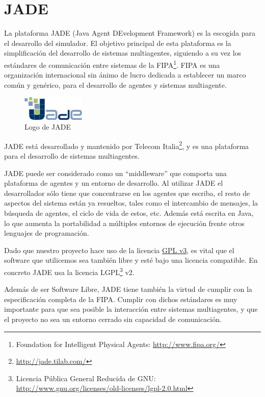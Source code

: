 \section{JADE}

La plataforma JADE (Java Agent DEvelopment Framework) es la escogida para el
desarrollo del simulador. El objetivo principal de esta plataforma es la
simplificación del desarrollo de sistemas multiagentes, siguiendo a su vez los
estándares de comunicación entre sistemas de la FIPA\footnote{Foundation for
Intelligent Physical Agents: \url{http://www.fipa.org/}}. FIPA es una
organización internacional sin ánimo de lucro dedicada a establecer un marco
común y genérico, para el desarrollo de agentes y sistemas multiagente.

\begin{figure}[H]
 \centering
 \includegraphics[width=30mm]{figuras/cap4/jade.png}
 \caption{Logo de JADE}
\end{figure}

JADE está desarrollado y mantenido por Telecom
Italia\footnote{\url{http://jade.tilab.com/}}, y es una plataforma para el
desarrollo de sistemas multiagentes.

JADE puede ser considerado como un ``middleware'' que comporta una plataforma de
agentes y un entorno de desarrollo. Al utilizar JADE el desarrollador sólo tiene
que concentrarse en los agentes que escriba, el resto de aspectos del sistema
están ya resueltos, tales como el intercambio de mensajes, la búsqueda de
agentes, el ciclo de vida de estos, etc. Además está escrita en Java, lo que
aumenta la portabilidad a múltiples entornos de ejecución frente otros lenguajes
de programación.

Dado que nuestro proyecto hace uso de la licencia \hyperref[ap1]{GPL v3}, es
vital que el software que utilicemos sea también libre y esté bajo una licencia
compatible. En concreto JADE usa la licencia LGPL\footnote{Licencia Pública
General Reducida de GNU:\\
\hspace*{7mm}\url{http://www.gnu.org/licenses/old-licenses/lgpl-2.0.html}} v2.

Además de ser Software Libre, JADE tiene también la virtud de cumplir con la
especificación completa de la FIPA. Cumplir con dichos estándares es muy
importante para que sea posible la interacción entre sistemas multiagentes, y
que el proyecto no sea un entorno cerrado sin capacidad de comunicación.


